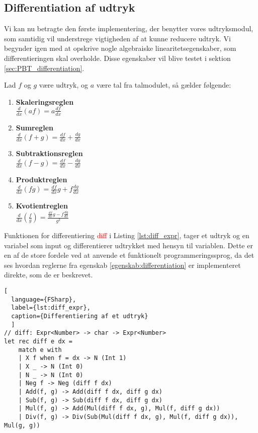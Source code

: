 \subsection{Differentiation af udtryk}
Vi kan nu betragte den første implementering, der benytter vores udtryksmodul, som samtidig vil understrege vigtigheden af at kunne reducere udtryk. Vi begynder igen med at opskrive nogle algebraiske linearitetsegenskaber, som differentieringen skal overholde. Disse egenskaber vil blive testet i sektion \ref{sec:PBT_differentiation}.
\vspace{0.5cm}
\begin{egenskab}\label{egenskab:differentiation}
  Lad $f$ og $g$ være udtryk, og $a$ være tal fra talmodulet, så gælder følgende:
  \begin{enumerate}
    \item \textbf{Skaleringsreglen} \\
    \(\frac{d}{dx}(af) = a\frac{df}{dx}\)
    \item \textbf{Sumreglen} \\
    \(\frac{d}{dx}(f+g) = \frac{df}{dx} + \frac{dg}{dx}\)
    \item \textbf{Subtraktionsreglen} \\
    \(\frac{d}{dx}(f-g) = \frac{df}{dx} - \frac{dg}{dx}\)
    \item \textbf{Produktreglen} \\
    \(\frac{d}{dx}(fg) = \frac{df}{dx}g + f\frac{dg}{dx}\)
    \item \textbf{Kvotientreglen} \\
    \(\frac{d}{dx}\left(\frac{f}{g}\right) = \frac{\frac{df}{dx}g - f\frac{dg}{dx}}{g^2}\)
  \end{enumerate}
\end{egenskab}

Funktionen for differentiering \textcolor{red}{diff} i Listing \ref{lst:diff_expr}, tager et udtryk og en variabel som input og differentierer udtrykket med hensyn til variablen. Dette er en af de store fordele ved at anvende et funktionelt programmeringssprog, da det ses hvordan reglerne fra egenskab \ref{egenskab:differentiation} er implementeret direkte, som de er beskrevet.

\begin{lstlisting}[
  language={FSharp}, 
  label={lst:diff_expr}, 
  caption={Differentiering af et udtryk}
  ]
// diff: Expr<Number> -> char -> Expr<Number>
let rec diff e dx = 
    match e with
    | X f when f = dx -> N (Int 1)
    | X _ -> N (Int 0)
    | N _ -> N (Int 0)
    | Neg f -> Neg (diff f dx)
    | Add(f, g) -> Add(diff f dx, diff g dx)
    | Sub(f, g) -> Sub(diff f dx, diff g dx)
    | Mul(f, g) -> Add(Mul(diff f dx, g), Mul(f, diff g dx))
    | Div(f, g) -> Div(Sub(Mul(diff f dx, g), Mul(f, diff g dx)), Mul(g, g))
\end{lstlisting}

